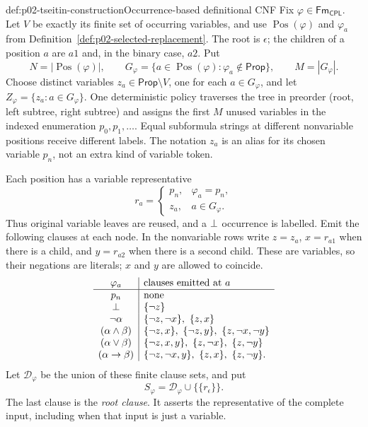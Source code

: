 \begin{hbdefinition}{def:p02-tseitin-construction}{Occurrence-based definitional CNF}
Fix \(\varphi\in\mathsf{Fm}_{\mathsf{CPL}}\).  Let \(V\) be exactly its finite set of
occurring variables, and use \(\operatorname{Pos}(\varphi)\) and
\(\varphi_a\) from Definition~\ref{def:p02-selected-replacement}.
The root is \(\epsilon\); the children of a position \(a\) are \(a1\)
and, in the binary case, \(a2\).  Put
\[
 N=|\operatorname{Pos}(\varphi)|,\qquad
 G_\varphi=\{a\in\operatorname{Pos}(\varphi):\varphi_a\notin\mathsf{Prop}\},
 \qquad M=|G_\varphi|.
\]
Choose distinct variables \(z_a\in\mathsf{Prop}\setminus V\), one for each
\(a\in G_\varphi\), and let \(Z_\varphi=\{z_a:a\in G_\varphi\}\).
One deterministic policy traverses the tree in preorder (root, left subtree,
right subtree) and assigns the first \(M\) unused variables in the indexed
enumeration \(p_0,p_1,\ldots\).  Equal subformula strings at different
nonvariable positions receive different labels.  The notation \(z_a\) is an
alias for its chosen variable \(p_n\), not an extra kind of variable token.

Each position has a variable representative
\[
 r_a=\begin{cases}
       p_n,&\varphi_a=p_n,\\
       z_a,&a\in G_\varphi.
      \end{cases}
\]
Thus original variable leaves are reused, and a \(\bot\) occurrence is
labelled.  Emit the following clauses at each node.  In the nonvariable rows
write \(z=z_a\), \(x=r_{a1}\) when there is a child, and
\(y=r_{a2}\) when there is a second child.  These are variables, so their
negations are literals; \(x\) and \(y\) are allowed to coincide.
\[
\begin{array}{c|l}
 \varphi_a&\text{clauses emitted at }a\\ \hline
 p_n&\text{none}\\
 \bot&\{\neg z\}\\
 \neg\alpha&\{\neg z,\neg x\},\ \{z,x\}\\
 (\alpha\land\beta)&
   \{\neg z,x\},\ \{\neg z,y\},\ \{z,\neg x,\neg y\}\\
 (\alpha\lor\beta)&
   \{\neg z,x,y\},\ \{z,\neg x\},\ \{z,\neg y\}\\
 (\alpha\to\beta)&
   \{\neg z,\neg x,y\},\ \{z,x\},\ \{z,\neg y\}.
\end{array}
\]
Let \(\mathcal D_\varphi\) be the union of these finite clause sets, and put
\[
 S_\varphi=\mathcal D_\varphi\cup\bigl\{\{r_\epsilon\}\bigr\}.
\]
The last clause is the \emph{root clause}.  It asserts the representative of
the complete input, including when that input is just a variable.


\end{hbdefinition}
